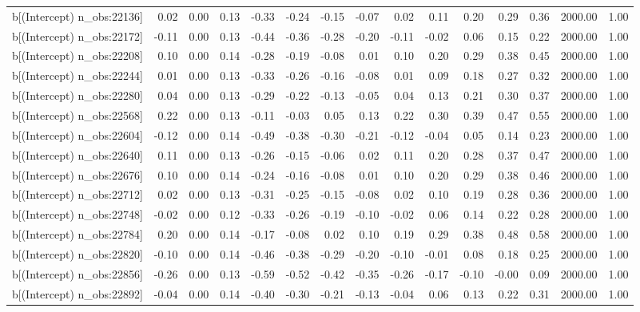 \begin{table}[ht]
\begin{tabular}{rrrrrrrrrrrrrrr}
  b[(Intercept) n\_obs:22136] & 0.02 & 0.00 & 0.13 & -0.33 & -0.24 & -0.15 & -0.07 & 0.02 & 0.11 & 0.20 & 0.29 & 0.36 & 2000.00 & 1.00 \\ 
  b[(Intercept) n\_obs:22172] & -0.11 & 0.00 & 0.13 & -0.44 & -0.36 & -0.28 & -0.20 & -0.11 & -0.02 & 0.06 & 0.15 & 0.22 & 2000.00 & 1.00 \\ 
  b[(Intercept) n\_obs:22208] & 0.10 & 0.00 & 0.14 & -0.28 & -0.19 & -0.08 & 0.01 & 0.10 & 0.20 & 0.29 & 0.38 & 0.45 & 2000.00 & 1.00 \\ 
  b[(Intercept) n\_obs:22244] & 0.01 & 0.00 & 0.13 & -0.33 & -0.26 & -0.16 & -0.08 & 0.01 & 0.09 & 0.18 & 0.27 & 0.32 & 2000.00 & 1.00 \\ 
  b[(Intercept) n\_obs:22280] & 0.04 & 0.00 & 0.13 & -0.29 & -0.22 & -0.13 & -0.05 & 0.04 & 0.13 & 0.21 & 0.30 & 0.37 & 2000.00 & 1.00 \\ 
  b[(Intercept) n\_obs:22568] & 0.22 & 0.00 & 0.13 & -0.11 & -0.03 & 0.05 & 0.13 & 0.22 & 0.30 & 0.39 & 0.47 & 0.55 & 2000.00 & 1.00 \\ 
  b[(Intercept) n\_obs:22604] & -0.12 & 0.00 & 0.14 & -0.49 & -0.38 & -0.30 & -0.21 & -0.12 & -0.04 & 0.05 & 0.14 & 0.23 & 2000.00 & 1.00 \\ 
  b[(Intercept) n\_obs:22640] & 0.11 & 0.00 & 0.13 & -0.26 & -0.15 & -0.06 & 0.02 & 0.11 & 0.20 & 0.28 & 0.37 & 0.47 & 2000.00 & 1.00 \\ 
  b[(Intercept) n\_obs:22676] & 0.10 & 0.00 & 0.14 & -0.24 & -0.16 & -0.08 & 0.01 & 0.10 & 0.20 & 0.29 & 0.38 & 0.46 & 2000.00 & 1.00 \\ 
  b[(Intercept) n\_obs:22712] & 0.02 & 0.00 & 0.13 & -0.31 & -0.25 & -0.15 & -0.08 & 0.02 & 0.10 & 0.19 & 0.28 & 0.36 & 2000.00 & 1.00 \\ 
  b[(Intercept) n\_obs:22748] & -0.02 & 0.00 & 0.12 & -0.33 & -0.26 & -0.19 & -0.10 & -0.02 & 0.06 & 0.14 & 0.22 & 0.28 & 2000.00 & 1.00 \\ 
  b[(Intercept) n\_obs:22784] & 0.20 & 0.00 & 0.14 & -0.17 & -0.08 & 0.02 & 0.10 & 0.19 & 0.29 & 0.38 & 0.48 & 0.58 & 2000.00 & 1.00 \\ 
  b[(Intercept) n\_obs:22820] & -0.10 & 0.00 & 0.14 & -0.46 & -0.38 & -0.29 & -0.20 & -0.10 & -0.01 & 0.08 & 0.18 & 0.25 & 2000.00 & 1.00 \\ 
  b[(Intercept) n\_obs:22856] & -0.26 & 0.00 & 0.13 & -0.59 & -0.52 & -0.42 & -0.35 & -0.26 & -0.17 & -0.10 & -0.00 & 0.09 & 2000.00 & 1.00 \\ 
  b[(Intercept) n\_obs:22892] & -0.04 & 0.00 & 0.14 & -0.40 & -0.30 & -0.21 & -0.13 & -0.04 & 0.06 & 0.13 & 0.22 & 0.31 & 2000.00 & 1.00 \\ 

\end{tabular}
\end{table}
